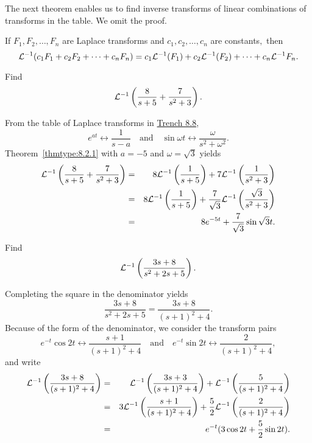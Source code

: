 \documentclass{ximera}
\begin{document}
The next theorem enables us to find inverse transforms of linear
combinations of transforms in the table. We omit the proof.

\begin{theorem}\label{thmtype:8.2.1}
If $F_1, F_2, \dots, F_n$ are Laplace transforms and
$c_1, c_2, \dots, c_n$ are constants$,$ then
$$
{\cal L}^{-1}(c_1F_1+c_2F_2+\cdots+c_nF_n)=c_1{\cal L}^{-1}(F_1)+c_2{\cal
L}^{-1}(F_2)+\cdots+c_n{\cal L}^{-1}F_n.
$$
\end{theorem}

\begin{example}\label{example:8.2.2} Find
$$
{\cal L}^{-1}\left(\frac{8}{s+5}+\frac{7}{s^2+3}\right).
$$


\begin{explanation}
From the table of Laplace transforms in \href{https://ximera.osu.edu/ode/main/laplaceTable/laplaceTable}{Trench 8.8},
$$
e^{at}\leftrightarrow \frac{1}{s-a}\quad\mbox{and}\quad
\sin\omega t\leftrightarrow \frac{\omega}{s^2+\omega^2}.
$$
Theorem~\ref{thmtype:8.2.1}
with $a=-5$ and   $\omega=\sqrt3$
yields
\begin{eqnarray*}
{\cal L}^{-1}\left(\frac{8}{s+5}+\frac{7}{s^2+3}\right)&=&
8{\cal L}^{-1}\left(\frac{1}{s+5}\right)+7{\cal L}^{-1}\left(\frac{1}{s^2+3}\right)\\
&=&
8{\cal L}^{-1}\left(\frac{1}{s+5}\right)+\frac{7}{\sqrt3}{\cal
L}^{-1}\left(\frac{\sqrt3}{s^2+3}\right)\\&=&8e^{-5t}+\frac{7}{\sqrt3}\sin\sqrt3t.
\end{eqnarray*}
\end{explanation}
\end{example}

\begin{example}\label{example:8.2.3} Find
$$
{\cal L}^{-1}\left(\frac{3s+8}{s^2+2s+5}\right).
$$

\begin{explanation}
Completing the square in the denominator yields
$$
\frac{3s+8}{s^2+2s+5}=\frac{3s+8}{(s+1)^2+4}.
$$
Because of the form of the denominator, we consider
the transform pairs
$$
 e^{-t}\cos 2t\leftrightarrow\frac{s+1}{(s+1)^2+4}
\quad\mbox{and}\quad
 e^{-t}\sin 2t\leftrightarrow\frac{2}{(s+1)^2+4},
$$
and write
\begin{eqnarray*}
{\cal L}^{-1}\left(\frac{3s+8}{(s+1)^2+4}\right)&=&
{\cal L}^{-1}\left(\frac{3s+3}{(s+1)^2+4}\right)+
{\cal L}^{-1}\left(\frac{5}{(s+1)^2+4}\right)\\&=&
3{\cal L}^{-1}\left(\frac{s+1}{(s+1)^2+4}\right)+
\frac{5}{2}{\cal L}^{-1}\left(\frac{2}{(s+1)^2+4}\right)\\&=&
e^{-t}(3\cos 2t+\frac{5}{2}\sin 2t).
\end{eqnarray*}
\end{explanation}
\end{example}
\end{document}

